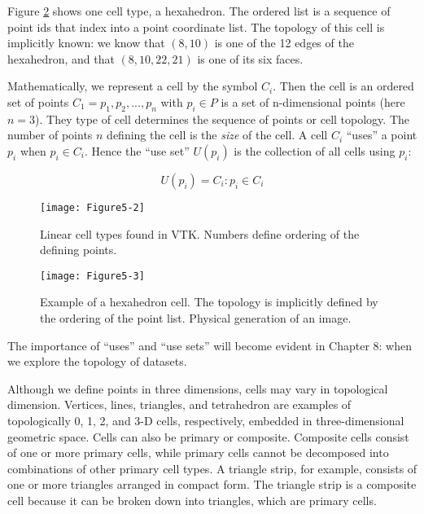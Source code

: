 Figure \ref{fig:Figure5-3} shows one cell type, a hexahedron. The ordered list is a sequence of point ids that index into a point coordinate list. The topology of this cell is implicitly known: we know that $(8,10)$ is one of the 12 edges of the hexahedron, and that $(8,10,22,21)$ is one of its six faces.

Mathematically, we represent a cell by the symbol $C_i$. Then the cell is an ordered set of points $C_1 = {p_1, p_2,..., p_n}$ with $p_i \in P$ is a set of n-dimensional points (here $n=3$). They type of cell determines the sequence of points or cell topology. The number of points $n$ defining the cell is the \emph{size} of the cell. A cell $C_i$ ``uses'' a point $p_i$ when $p_i \in C_i$. Hence the ``use set'' $U(p_i)$ is the collection of all cells using $p_i$:

\begin{equation}\label{eq:5.1}
U(p_i) = {C_i:p_i \in C_i}
\end{equation}

\begin{figure}[!htb]
	\centering
	\texttt{[image: Figure5-2]}
	\caption{Linear cell types found in VTK. Numbers define ordering of the defining points.}
	\label{fig:Figure5-2}
\end{figure}


\begin{figure}[!htb]
	\centering
	\texttt{[image: Figure5-3]}
	\caption{Example of a hexahedron cell. The topology is implicitly defined by the ordering of the point list. Physical generation of an image.}
	\label{fig:Figure5-3}
\end{figure}

The importance of ``uses'' and ``use sets'' will become evident in Chapter 8:  when we explore the topology of datasets.

Although we define points in three dimensions, cells may vary in topological dimension. Vertices, lines, triangles, and tetrahedron are examples of topologically 0, 1, 2, and 3-D cells, respectively, embedded in three-dimensional geometric space. Cells can also be primary or composite. Composite cells consist of one or more primary cells, while primary cells cannot be decomposed into combinations of other primary cell types. A triangle strip, for example, consists of one or more triangles arranged in compact form. The triangle strip is a composite cell because it can be broken down into triangles, which are primary cells.

